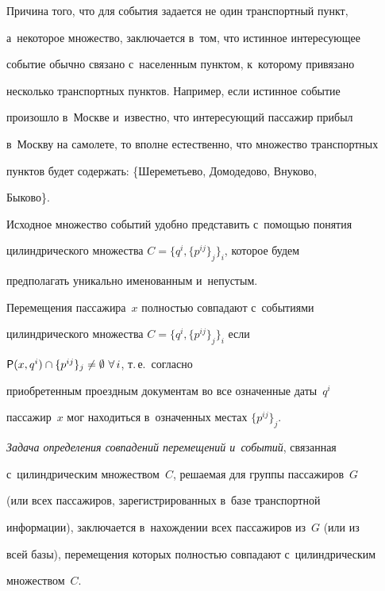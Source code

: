 Причина того, что для события задается не один транспортный пункт, 


а~некоторое множество, заключается в~том, что истинное интересующее 


событие обычно связано с~населенным пунктом, к~которому привязано 


несколько транспортных пунктов. Например, если истинное событие 


произошло в~Москве и~известно, что ин\-те\-ре\-су\-ющий пассажир прибыл 


в~Москву на самолете, то вполне естественно, что множество транспортных 


пунк\-тов будет содержать: \{Шереметьево, Домодедово, Внуково, 


Быково\}.





Исходное множество событий удобно пред\-ста\-вить с~по\-мощью понятия 


ци\-линд\-ри\-че\-ско\-го множества $C =\{q^i, \{p^{ij}\}_j\}_i$, которое будем 


предполагать уникально именованным и~непустым.





Перемещения пассажира~$x$ полностью совпадают с~событиями 


ци\-линд\-ри\-че\-ско\-го множества $C =\{q^i, \{p^{ij}\}_j\}_i$ если  


${\sf P} (x, q^i) \cap \{p^{ij}\}_j \not= \emptyset~\forall\,i$, т.\,е.\ согласно 


приобретенным проездным документам во все означенные даты~$q^i$ 


пассажир~$x$ мог находиться в~означенных местах $\{p^{ij}\}_j$.





\textit{Задача определения совпадений перемещений и~событий}, связанная 


с~ци\-линд\-ри\-че\-ским множеством~$C$, ре\-ша\-емая для группы пассажиров~$G$ 


(или всех пассажиров, зарегистрированных в~базе транспортной 


информации), за\-клю\-ча\-ет\-ся в~нахождении всех пассажиров из~$G$ (или из 


всей базы), перемещения которых пол\-ностью совпадают с~ци\-линд\-ри\-че\-ским 


множеством~$C$.





